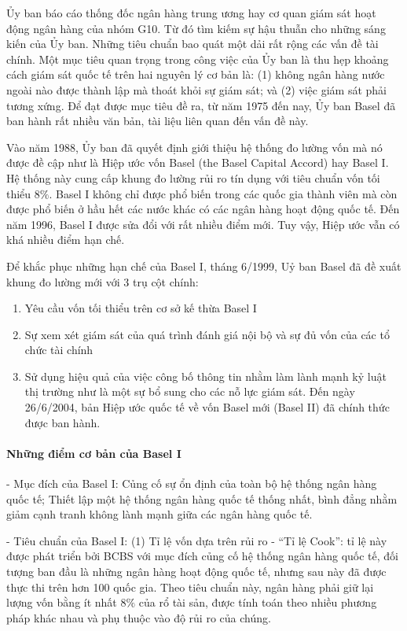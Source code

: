 Ủy ban báo cáo thống đốc ngân hàng trung ương hay cơ quan giám sát hoạt động ngân hàng của nhóm G10. Từ đó tìm kiếm sự hậu thuẫn cho những sáng kiến của Ủy ban. Những tiêu chuẩn bao quát một dải rất rộng các vấn đề tài chính. Một mục tiêu quan trọng trong công việc của Ủy ban là thu hẹp khoảng cách giám sát quốc tế trên hai nguyên lý cơ bản là: (1) không ngân hàng nước ngoài nào được thành lập mà thoát khỏi sự giám sát; và (2) việc giám sát phải tương xứng. Để đạt được mục tiêu đề ra, từ năm 1975 đến nay, Ủy ban Basel đã ban hành rất nhiều văn bản, tài liệu liên quan đến vấn đề này.

Vào năm 1988, Ủy ban đã quyết định giới thiệu hệ thống đo lường vốn mà nó được đề cập như là Hiệp ước vốn Basel (the Basel Capital Accord) hay Basel I. Hệ thống này cung cấp khung đo lường rủi ro tín dụng với tiêu chuẩn vốn tối thiểu $8\%$. Basel I không chỉ được phổ biến trong các quốc gia thành viên mà còn được phổ biến ở hầu hết các nước khác có các ngân hàng hoạt động quốc tế. Đến năm 1996, Basel I được sửa đổi với rất nhiều điểm mới. Tuy vậy, Hiệp ước vẫn có khá nhiều điểm hạn chế.

Để khắc phục những hạn chế của Basel I, tháng 6/1999, Uỷ ban Basel đã đề xuất khung đo lường mới với 3 trụ cột chính: 
\begin{enumerate}
\item Yêu cầu vốn tối thiểu trên cơ sở kế thừa Basel I 
\item Sự xem xét giám sát của quá trình đánh giá nội bộ và sự đủ vốn của các tổ chức tài chính
\item Sử dụng hiệu quả của việc công bố thông tin nhằm làm lành mạnh kỷ luật thị trường như là một sự bổ sung cho các nỗ lực giám sát. Đến ngày 26/6/2004, bản Hiệp ước quốc tế về vốn Basel mới (Basel II) đã chính thức được ban hành.
\end{enumerate}


\paragraph{Những điểm cơ bản của Basel I}

- Mục đích của Basel I: Củng cố sự ổn định của toàn bộ hệ thống ngân hàng quốc tế;
Thiết lập một hệ thống ngân hàng quốc tế thống nhất, bình đẳng nhằm giảm cạnh tranh không lành mạnh giữa các ngân hàng quốc tế.

- Tiêu chuẩn của Basel I: (1) Tỉ lệ vốn dựa trên rủi ro - “Tỉ lệ Cook”: tỉ lệ này được phát triển bởi BCBS với mục đích củng cố hệ thống ngân hàng quốc tế, đối tượng ban đầu là những ngân hàng hoạt động quốc tế, nhưng sau này đã được thực thi trên hơn 100 quốc gia. Theo tiêu chuẩn này, ngân hàng phải giữ lại lượng vốn bằng ít nhất $8\%$ của rổ tài sản, được tính toán theo nhiều phương pháp khác nhau và phụ thuộc vào độ rủi ro của chúng.

